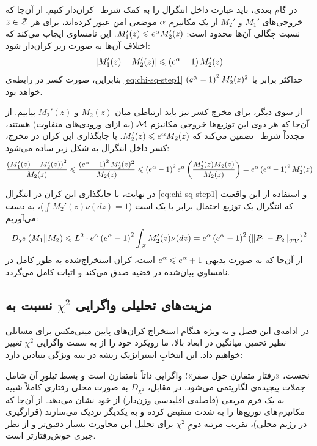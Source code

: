 \begin{اثبات}
در گام بعدی، باید عبارت داخل انتگرال را به کمک شرط \LDP\ کران‌دار کنیم. از آن‌جا که خروجی‌های $M_1'$ و $M_2'$ از یک مکانیزم $\alpha$-موضعی امن عبور کرده‌اند، برای هر $z \in \Zset$ نسبت چگالی آن‌ها محدود است: $M_1'(z) \leqslant e^{\alpha} M_2'(z)$. 
این نامساوی ایجاب می‌کند که اختلاف آن‌ها به صورت زیر کران‌دار شود:
\begin{equation}
\left| M_1'(z) - M_2'(z) \right| \leqslant \left(e^{\alpha} - 1\right) M_2'(z)
\end{equation}
بنابراین، صورت کسر در رابطه‌ی \eqref{eq:chi-sq-step1} حداکثر برابر با $\left(e^{\alpha} - 1\right)^2 M_2'(z)^2$ خواهد بود.

از سوی دیگر، برای مخرج کسر نیز باید ارتباطی میان $M_2(z)$ و $M_2'(z)$ بیابیم. از آن‌جا که هر دوی این توزیع‌ها خروجی مکانیزم $\mech$ (به ازای ورودی‌های متفاوت) هستند، مجدداً شرط \LDP\ تضمین می‌کند که $M_2'(z) \leqslant e^{\alpha} M_2(z)$. با جایگذاری این کران در مخرج، کسر داخل انتگرال به شکل زیر ساده می‌شود:
\begin{equation}
\frac{\left( M_1'(z) - M_2'(z) \right)^2}{M_2(z)} \leqslant \frac{\left(e^{\alpha} - 1\right)^2 M_2'(z)^2}{M_2(z)} \leqslant \left(e^{\alpha} - 1\right)^2 e^{\alpha} \left( \frac{M_2'(z) M_2(z)}{M_2(z)} \right) = e^{\alpha} \left(e^{\alpha} - 1\right)^2 M_2'(z)
\end{equation}

در نهایت، با جایگذاری این کران در انتگرال \eqref{eq:chi-sq-step1} و استفاده از این واقعیت که انتگرال یک توزیع احتمال برابر با یک است ($\int M_2'(z) \nu(dz) = 1$)، به دست می‌آوریم:
\begin{equation}
D_{\chi^2}\left(M_1 \| M_2\right) \lee L^2 \cdot e^\al \left(e^\al - 1\right)^2 \int_{\Zset} M_2'(z) \nu(dz) = e^\al \left(e^\al - 1\right)^2 \left(\norm{P_1 - P_2}_{TV}\right)^2
\end{equation}
از آن‌جا که به صورت بدیهی $e^{\alpha} \leqslant e^{\alpha} + 1$ است، کران استخراج‌شده به طور کامل در نامساوی بیان‌شده در قضیه صدق می‌کند و اثبات کامل می‌گردد.
\end{اثبات}

\subsection{مزیت‌های تحلیلی واگرایی $\chi^2$ نسبت به }
در ادامه‌ی این فصل و به ویژه هنگام استخراج کران‌های پایین مینی‌مکس برای مسائلی نظیر تخمین میانگین در ابعاد بالا، ما رویکرد خود را از  به سمت واگرایی $\chi^2$ تغییر خواهیم داد. این انتخابِ استراتژیک ریشه در سه ویژگی بنیادین دارد:

نخست، «رفتار متقارن حول صفر»؛ واگرایی  ذاتاً نامتقارن است و بسط تیلورِ آن شامل جملات پیچیده‌ی لگاریتمی می‌شود. در مقابل، $D_{\chi^2}$ به صورت محلی رفتاری کاملاً شبیه به یک فرم مربعی (فاصله‌ی اقلیدسی وزن‌دار) از خود نشان می‌دهد. از آن‌جا که مکانیزم‌های \LDP توزیع‌ها را به شدت منقبض کرده و به یکدیگر نزدیک می‌سازند (قرارگیری در رژیم محلی)، تقریب مرتبه دومِ $\chi^2$ برای تحلیل این مجاورت بسیار دقیق‌تر و از نظر جبری خوش‌رفتارتر است.

